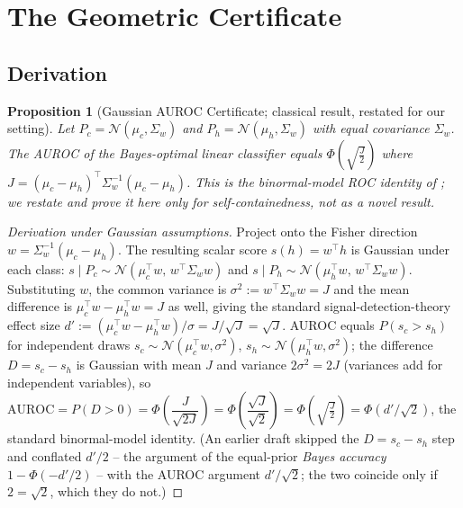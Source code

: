 \documentclass[10pt,twocolumn]{article}
\newtheorem{proposition}{Proposition}
\begin{document}
\section{The Geometric Certificate}
\label{sec:certificate}

\subsection{Derivation}
\label{sec:cert-derivation}

\begin{proposition}[Gaussian AUROC Certificate; classical result, restated for our setting]
\label{prop:cert}
Let $P_c = \mathcal{N}(\mu_c, \Sigma_w)$ and
$P_h = \mathcal{N}(\mu_h, \Sigma_w)$ with equal covariance $\Sigma_w$.
The AUROC of the Bayes-optimal linear classifier equals
$\Phi\!\left(\sqrt{\frac{J}{2}}\right)$
where $J = (\mu_c - \mu_h)^\top \Sigma_w^{-1} (\mu_c - \mu_h)$. This is the
binormal-model ROC identity of \citet{green1966signal,bamber1975area,
hanley1982meaning}; we restate and prove it here only for
self-containedness, not as a novel result.
\end{proposition}

\begin{proof}[Derivation under Gaussian assumptions]
Project onto the Fisher direction $w = \Sigma_w^{-1}(\mu_c - \mu_h)$.
The resulting scalar score $s(h) = w^\top h$ is Gaussian under each class:
$s \mid P_c \sim \mathcal{N}(\mu^\top_c w,\, w^\top\Sigma_w w)$ and
$s \mid P_h \sim \mathcal{N}(\mu^\top_h w,\, w^\top\Sigma_w w)$.
Substituting $w$, the common variance is $\sigma^2 := w^\top\Sigma_w w = J$
and the mean difference is $\mu^\top_c w - \mu^\top_h w = J$ as well, giving
the standard signal-detection-theory effect size
$d' := (\mu^\top_c w - \mu^\top_h w)/\sigma = J/\sqrt{J} = \sqrt{J}$.
AUROC equals $P(s_c > s_h)$ for independent draws
$s_c \sim \mathcal{N}(\mu^\top_c w, \sigma^2)$,
$s_h \sim \mathcal{N}(\mu^\top_h w, \sigma^2)$; the difference
$D = s_c - s_h$ is Gaussian with mean $J$ and variance $2\sigma^2 = 2J$
(variances add for independent variables), so
$\text{AUROC} = P(D > 0) = \Phi\!\left(\dfrac{J}{\sqrt{2J}}\right)
= \Phi\!\left(\dfrac{\sqrt{J}}{\sqrt{2}}\right)
= \Phi\!\left(\sqrt{\frac{J}{2}}\right) = \Phi(d'/\sqrt{2})$,
the standard binormal-model identity. (An earlier draft skipped the
$D = s_c - s_h$ step and conflated $d'/2$ -- the argument of the
equal-prior \emph{Bayes accuracy} $1 - \Phi(-d'/2)$ -- with the AUROC
argument $d'/\sqrt{2}$; the two coincide only if $2 = \sqrt{2}$, which they
do not.)
\end{proof}
\end{document}
